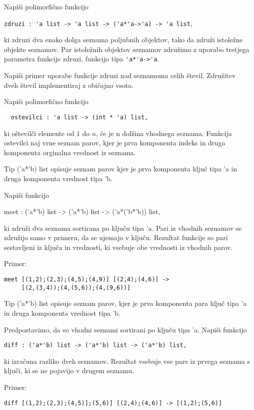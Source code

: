 \begin{ex}
Napi\v si polimorfi\v cno funkcijo 

\begin{center}
\lstinline{zdruzi : 'a list -> 'a list -> ('a*'a->'a) -> 'a list}, 
\end{center}

ki zdruzi dva enako dolga seznama poljubnih objektov, tako da zdru\v zi istole\v zne objekte seznamov. Par istole\v znih objektov seznamov zdru\v zimo z uporabo tretjega parametra funkcije zdruzi, funkcijo tipa \lstinline{'a*'a->'a}.

Napi\v si primer uporabe funkcije zdruzi nad seznamoma celih \v stevil. Zdru\v zitev dveh \v stevil implementiraj z obi\v cajno vsoto. 
\end{ex}
\begin{ex}
  Napi\v si polimorfi\v cno funkcijo
  \begin{lstlisting}
  ostevilci : 'a list -> (int * 'a) list, 
  \end{lstlisting}
  ki o\v stevil\v ci elemente od $1$ do $n$, \v ce je n dol\v zina
  vhodnega seznama. Funkcija ostevilci naj vrne seznam parov, kjer je
  prva komponenta indeks in druga komponenta orginalna vrednost iz
  seznama.

\end{ex} 
\begin{ex}
Tip ('a*'b) list opisuje seznam parov kjer je prva komponenta klju\v c tipa 'a in druga komponenta vrednost tipa 'b. 

Napi\v si funkcijo 

meet : ('a*'b) list -> ('a*'b) list -> ('a*('b*'b)) list,

ki zdru\v zi dva seznama sortirana po klju\v cu tipa 'a. Pari iz vhodnih seznamov se zdru\v zijo samo v primeru, da se ujemajo v klju\v cu. Rezultat funkcije so pari sestavljeni iz klju\v ca in vrednosti, ki vsebuje obe vrednosti iz vhodnih parov.  

Primer:    
\begin{lstlisting}
meet [(1,2);(2,3);(4,5);(4,9)] [(2,4);(4,6)] -> 
     [(2,(3,4));(4,(5,6));(4,(9,6))]
\end{lstlisting}


\end{ex} 
\begin{ex}
  Tip ('a*'b) list opisuje seznam parov, kjer je prva komponenta para
  klju\v c tipa 'a in druga komponenta vrednost tipa 'b.

  Predpostavimo, da so vhodni seznami sortirani po klju\v cu tipa
  'a. Napi\v si funkcijo

\begin{lstlisting}
diff : ('a*'b) list -> ('a*'b) list -> ('a*'b) list,
\end{lstlisting}

  ki izra\v cuna razliko dveh seznamov. Rezultat vsebuje vse pare iz
  prvega seznama s klju\v ci, ki se ne pojavijo v drugem seznamu.

\noindent\/Primer:    
\begin{lstlisting}
diff [(1,2);(2,3);(4,5)];(5,6)] [(2,4);(4,6)] -> [(1,2);(5,6)]
\end{lstlisting}


\end{ex} 
